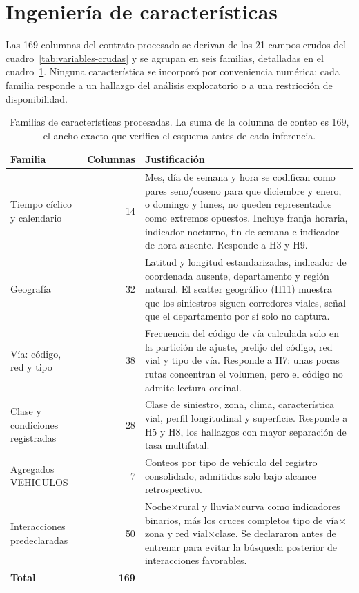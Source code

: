 \section{Ingeniería de características}\label{sec:ingenieria}

Las 169 columnas del contrato procesado se derivan de los 21 campos crudos del cuadro~\ref{tab:variables-crudas} y se agrupan en seis familias, detalladas en el cuadro~\ref{tab:familias-caracteristicas}. Ninguna característica se incorporó por conveniencia numérica: cada familia responde a un hallazgo del análisis exploratorio o a una restricción de disponibilidad.

\begin{table}[tbp]\centering\small
\caption{Familias de características procesadas. La suma de la columna de conteo es 169, el ancho exacto que verifica el esquema antes de cada inferencia.}
\label{tab:familias-caracteristicas}
\begin{tabularx}{\textwidth}{@{}p{4.1cm}r X@{}}\toprule
Familia & Columnas & Justificación \\\midrule
Tiempo cíclico y calendario & 14 & Mes, día de semana y hora se codifican como pares seno/coseno para que diciembre y enero, o domingo y lunes, no queden representados como extremos opuestos. Incluye franja horaria, indicador nocturno, fin de semana e indicador de hora ausente. Responde a H3 y H9. \\
Geografía & 32 & Latitud y longitud estandarizadas, indicador de coordenada ausente, departamento y región natural. El scatter geográfico (H11) muestra que los siniestros siguen corredores viales, señal que el departamento por sí solo no captura. \\
Vía: código, red y tipo & 38 & Frecuencia del código de vía calculada solo en la partición de ajuste, prefijo del código, red vial y tipo de vía. Responde a H7: unas pocas rutas concentran el volumen, pero el código no admite lectura ordinal. \\
Clase y condiciones registradas & 28 & Clase de siniestro, zona, clima, característica vial, perfil longitudinal y superficie. Responde a H5 y H8, los hallazgos con mayor separación de tasa multifatal. \\
Agregados VEHICULOS & 7 & Conteos por tipo de vehículo del registro consolidado, admitidos solo bajo alcance retrospectivo. \\
Interacciones predeclaradas & 50 & Noche$\times$rural y lluvia$\times$curva como indicadores binarios, más los cruces completos tipo de vía$\times$zona y red vial$\times$clase. Se declararon antes de entrenar para evitar la búsqueda posterior de interacciones favorables. \\\midrule
\textbf{Total} & \textbf{169} & \\\bottomrule
\end{tabularx}
\end{table}

